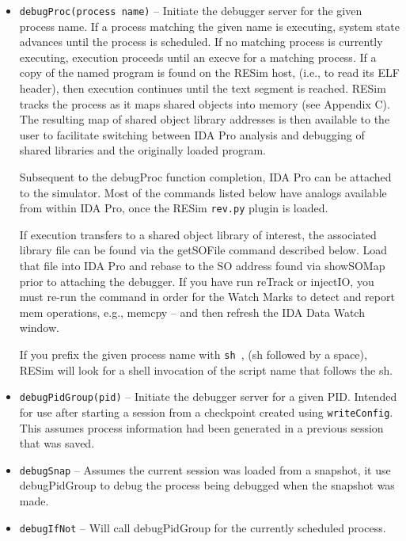 \documentclass[titlepage]{article}
\begin{document}
\begin{itemize}

\item {\tt debugProc(process name)} – Initiate the debugger server for the given process name.  If a process matching the given name is executing, system state advances until the process is scheduled.  If no matching process is currently executing, execution proceeds until an execve for a matching process.   If a copy of the named program is found on the RESim host, (i.e., to read its ELF header), then execution continues until the text segment is reached.  RESim tracks the process as it maps shared objects into memory (see Appendix C).  The resulting map of shared object library addresses is then available to the user to facilitate switching between IDA Pro analysis and debugging of shared libraries and the originally loaded program.

Subsequent to the debugProc  function completion, IDA Pro can be attached to the simulator.  Most of the commands listed below have analogs available from within IDA Pro, once the RESim {\tt rev.py} plugin is loaded.

If execution transfers to a shared object library of interest, the associated library file can be found via the getSOFile command described below.  Load that file into IDA Pro and rebase to the SO address
found via showSOMap prior to attaching the debugger.  If you have run reTrack or injectIO, you must re-run the command in order for the Watch Marks to 
detect and report mem operations, e.g., memcpy -- and then refresh the IDA Data Watch window. 

If you prefix the given process name with {\tt sh }, (sh followed by a space), RESim will look for a shell invocation of the script name that follows the sh.

\item {\tt debugPidGroup(pid)} -- Initiate the debugger server for a given PID.  Intended for use after starting a session from a checkpoint created using
{\tt writeConfig}.  This assumes process information had been generated in a previous session that was saved.  

\item {\tt debugSnap} -- Assumes the current session was loaded from a snapshot, it use debugPidGroup to debug the process being debugged when the snapshot was made.

\item {\tt debugIfNot} -- Will call debugPidGroup for the currently scheduled process.


\end{itemize}
\end{document}
